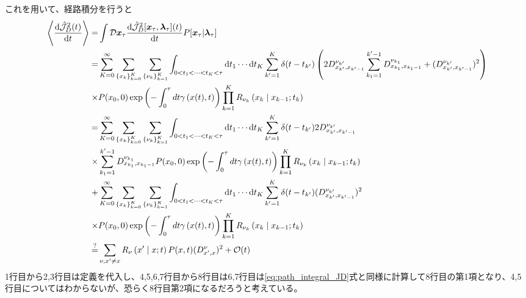 \documentclass{ltjsarticle}
\begin{document}
これを用いて、経路積分を行うと
\begin{align}
  \ev{\dv{\hat{\mathcal{J}}_D^2(t)}{t}}=&\int \mathcal{D}\bm{x}_\tau \dv{\hat{\mathcal{J}}_D^2[\bm{x}_\tau,\bm{\lambda}_\tau](t)}{t}P[\bm{x}_\tau|\bm{\lambda}_\tau]\\
  =&\sum_{K=0}^{\infty}\sum_{\lbrace x_k\rbrace_{k=0}^K}\sum_{\lbrace\nu_k\rbrace_{k=1}^K}\int_{0<t_1<\cdots<t_K<\tau}\dd{t_1}\cdots \dd{t_K}\sum_{k'=1}^{K}\delta(t-t_{k'})\left(2D^{\nu_{k'}}_{x_{k'},x_{k'-1}}\sum_{k_1=1}^{k'-1}D^{\nu_{k_1}}_{x_{k_1},x_{k_1-1}}+(D^{\nu_{k'}}_{x_{k'},x_{k'-1}})^2\right)\\
  \times&P(x_0,0)\exp\left(-\int_0^\tau dt\gamma\left(x(t),t\right)\right)\prod_{k=1}^K R_{\nu_k}\left(x_k\mid x_{k-1};t_k\right)\\
  =&\sum_{K=0}^{\infty}\sum_{\lbrace x_k\rbrace_{k=0}^K}\sum_{\lbrace\nu_k\rbrace_{k=1}^K}\int_{0<t_1<\cdots<t_K<\tau}\dd{t_1}\cdots \dd{t_K}\sum_{k'=1}^{K}\delta(t-t_{k'})2D^{\nu_{k'}}_{x_{k'},x_{k'-1}}\\
  \times&\sum_{k_1=1}^{k'-1}D^{\nu_{k_1}}_{x_{k_1},x_{k_1-1}}P(x_0,0)\exp\left(-\int_0^\tau dt\gamma\left(x(t),t\right)\right)\prod_{k=1}^K R_{\nu_k}\left(x_k\mid x_{k-1};t_k\right)\\
  +&\sum_{K=0}^{\infty}\sum_{\lbrace x_k\rbrace_{k=0}^K}\sum_{\lbrace\nu_k\rbrace_{k=1}^K}\int_{0<t_1<\cdots<t_K<\tau}\dd{t_1}\cdots \dd{t_K}\sum_{k'=1}^{K}\delta(t-t_{k'})(D^{\nu_{k'}}_{x_{k'},x_{k'-1}})^2\\
  \times&P(x_0,0)\exp\left(-\int_0^\tau dt\gamma\left(x(t),t\right)\right)\prod_{k=1}^K R_{\nu_k}\left(x_k\mid x_{k-1};t_k\right)\\
  \overset{?}{=}&\sum_{\nu,x'\neq x}R_{\nu}\left(x'\mid x;t\right)P(x,t)(D^{\nu}_{x',x})^2+\order{t}
\end{align}
1行目から2,3行目は定義を代入し、4,5,6,7行目から8行目は6,7行目は\eqref{eq:path_integral_JD}式と同様に計算して8行目の第1項となり、4,5行目についてはわからないが、恐らく8行目第2項になるだろうと考えている。\\
\end{document}
